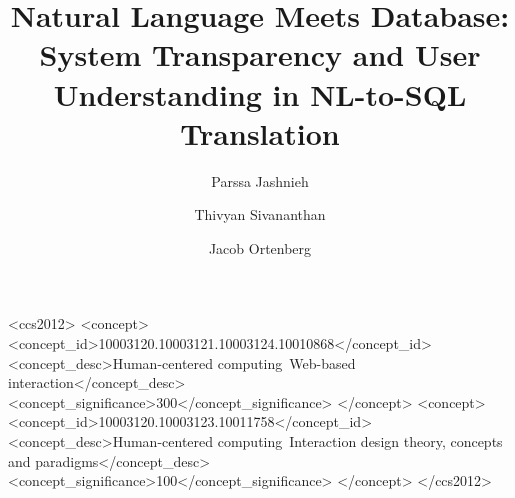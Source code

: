 \documentclass[manuscript,review]{acmart}
\begin{document}
\title{Natural Language Meets Database:
System Transparency and User
Understanding in NL-to-SQL
Translation}
\author{Parssa Jashnieh}
\author{Thivyan Sivananthan}
\author{Jacob Ortenberg}
\address{Bergische Universität Wuppertal}




\begin{CCSXML}
  <ccs2012>
     <concept>
         <concept_id>10003120.10003121.10003124.10010868</concept_id>
         <concept_desc>Human-centered computing~Web-based interaction</concept_desc>
         <concept_significance>300</concept_significance>
         </concept>
     <concept>
         <concept_id>10003120.10003123.10011758</concept_id>
         <concept_desc>Human-centered computing~Interaction design theory, concepts and paradigms</concept_desc>
         <concept_significance>100</concept_significance>
         </concept>
   </ccs2012>
\end{CCSXML}
  


\maketitle
\end{document}

